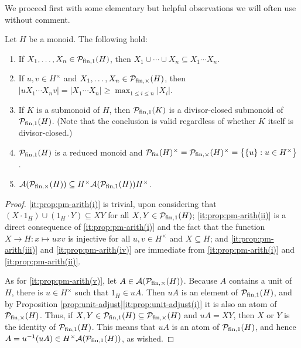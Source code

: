We proceed first with some elementary but helpful observations we will often use without comment.

\begin{prop}\label{prop:pm-arith}
	Let $H$ be a monoid. The following hold:
	\begin{enumerate}[label={\rm (\roman{*})}]
		\item\label{it:prop:pm-arith(i)} If $X_1,\ldots,X_n\in \mathcal{P}_{\textrm{fin},1}(H)$, then $X_1 \cup \cdots \cup X_n \subseteq X_1 \cdots X_n$.
		\item\label{it:prop:pm-arith(ii)} If $u,v \in H^\times$ and $X_1,\ldots,X_n\in \mathcal{P}_{\textrm{fin},\times}(H)$, then $|uX_1 \cdots X_nv| = |X_1 \cdots X_n| \ge \max_{1 \le i \le n} |X_i|$.
		\item\label{it:prop:pm-arith(iii)} If $K$ is a submonoid of $H$, then $\mathcal{P}_{\textrm{fin}, 1}(K)$ is a divisor-closed submonoid of $\mathcal{P}_{\textrm{fin}, 1}(H)$. \textup{(}Note that the conclusion is valid regardless of whether $K$ itself is divisor-closed.\textup{)}
		\item \label{it:prop:pm-arith(iv)} $\mathcal{P}_{\textrm{fin}, 1}(H)$ is a reduced monoid and $\mathcal{P}_{\textrm{fin}}(H)^\times=\mathcal{P}_{\textrm{fin}, \times}(H)^\times = \bigl\{ \{u\}: u\in H^\times\bigr\}$.
		\item \label{it:prop:pm-arith(v)} $\mathcal{A}(\mathcal P_{{\textrm{fin}, \times}}(H)) \subseteq H^\times \mathcal{A}(\mathcal P_{{\textrm{fin}, 1}}(H)) H^\times$.
	\end{enumerate}
\end{prop}
%
\begin{proof}
	\ref{it:prop:pm-arith(i)} is trivial, upon considering that $(X \cdot 1_H) \cup (1_H \cdot Y) \subseteq XY$ for all $X, Y \in \mathcal P_{\textrm{fin}, 1}(H)$; \ref{it:prop:pm-arith(ii)} is a direct consequence of \ref{it:prop:pm-arith(i)} and the fact that the function $X \to H: x \mapsto uxv$ is injective for all $u, v \in H^\times$ and $X \subseteq H$; and \ref{it:prop:pm-arith(iii)} and \ref{it:prop:pm-arith(iv)} are immediate from \ref{it:prop:pm-arith(i)} and \ref{it:prop:pm-arith(ii)}.
	
	As for \ref{it:prop:pm-arith(v)}, let $A\in \mathcal{A}(\mathcal{P}_{\textrm{fin}, \times}(H))$.
	Because $A$ contains a unit of $H$, there is $u\in H^\times$ such that $1_H \in uA$.
	Then $uA$ is an element of $\mathcal{P}_{\textrm{fin}, 1}(H)$, and by Proposition \ref{prop:unit-adjust}\ref{it:prop:unit-adjust(i)} it is also an atom of $\mathcal{P}_{\textrm{fin}, \times}(H)$.
	Thus, if $X,Y\in \mathcal{P}_{\textrm{fin}, 1}(H) \subseteq \mathcal{P}_{\textrm{fin}, \times}(H)$ and $uA = XY$, then $X$ or $Y$ is the identity of $\mathcal{P}_{\textrm{fin}, 1}(H)$.
	This means that $uA$ is an atom of $\mathcal{P}_{\textrm{fin}, 1}(H)$, and hence $A=u^{-1}(uA)\in H^\times \mathcal{A}(\mathcal{P}_{\textrm{fin}, 1}(H))$, as wished.
\end{proof}

